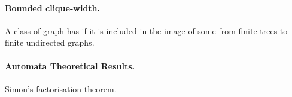 \paragraph*{Bounded clique-width.} A class of graph has  if it is included in the image of some 
from finite trees to finite undirected graphs.

\paragraph*{Automata Theoretical Results.}
Simon's factorisation theorem.




